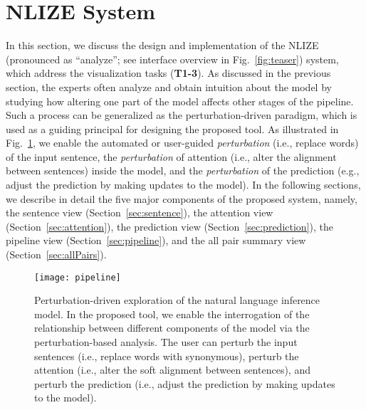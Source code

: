 

\section{NLIZE System}
In this section, we discuss the design and implementation of the NLIZE (pronounced as ``analyze''; see interface overview in Fig.~\ref{fig:teaser}) system, which address the visualization tasks (\textbf{T1-3}).
%
As discussed in the previous section, the experts often analyze and obtain intuition about the model by studying how altering one part of the model affects other stages of the pipeline.
%
Such a process can be generalized as the perturbation-driven paradigm, which is used as a guiding principal for designing the proposed tool.
%
As illustrated in Fig.~\ref{fig:modelPipeline}, we enable the automated or user-guided \emph{perturbation} (i.e., replace words) of the input sentence, the \emph{perturbation} of attention (i.e., alter the alignment between sentences) inside the model, and the \emph{perturbation} of the prediction (e.g., adjust the prediction by making updates to the model).
%
In the following sections, we describe in detail the five major components of the proposed system, namely, the sentence view  (Section~\ref{sec:sentence}), the attention view (Section~\ref{sec:attention}), the prediction view (Section~\ref{sec:prediction}), the pipeline view (Section~\ref{sec:pipeline}), and the all pair summary view (Section~\ref{sec:allPairs}).

\begin{figure}[htbp]
\vspace{-2mm}
\centering
 \texttt{[image: pipeline]}
 \vspace{-5mm}
 \caption{
 Perturbation-driven exploration of the natural language inference model.
 In the proposed tool, we enable the interrogation of the relationship between different components of the model via the perturbation-based analysis.
 The user can perturb the input sentences (i.e., replace words with synonymous), perturb the attention (i.e., alter the soft alignment between sentences), and perturb the prediction (i.e., adjust the prediction by making updates to the model).
}
\vspace{-2mm}
\label{fig:modelPipeline}
\end{figure}



%

